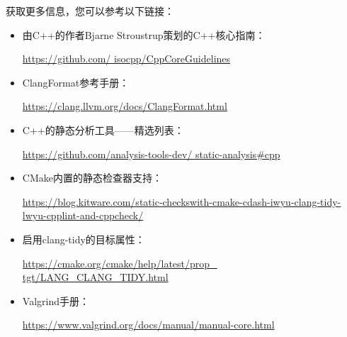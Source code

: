 
获取更多信息，您可以参考以下链接：

\begin{itemize}
\item
 由C++的作者Bjarne Stroustrup策划的C++核心指南：

 \url{https://github.com/ isocpp/CppCoreGuidelines}

\item
ClangFormat参考手册：

\url{https://clang.llvm.org/docs/ClangFormat.html}

\item
C++的静态分析工具——精选列表：

\url{https://github.com/analysis-tools-dev/ static-analysis#cpp}

\item
CMake内置的静态检查器支持：

\url{https://blog.kitware.com/static-checkswith-cmake-cdash-iwyu-clang-tidy-lwyu-cpplint-and-cppcheck/}

\item
启用clang-tidy的目标属性：

\url{https://cmake.org/cmake/help/latest/prop_ tgt/LANG_CLANG_TIDY.html}

\item
Valgrind手册：

\url{https://www.valgrind.org/docs/manual/manual-core.html}
\end{itemize}